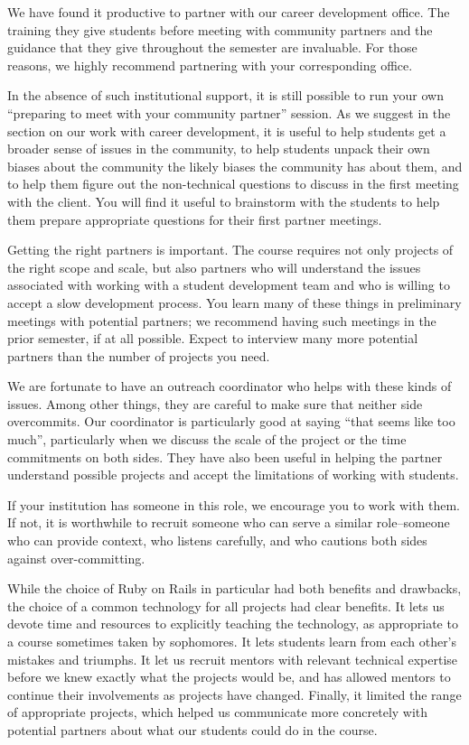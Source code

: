 We have found it productive to partner with our career development
office.  The training they give students before meeting with community
partners and the guidance that they give throughout the semester
are invaluable.  For those reasons, we highly recommend 
partnering with your corresponding office.

In the absence of such institutional support, it is still possible to run
your own ``preparing to meet with your community partner'' session.
As we suggest in the section on our work with career development,
it is useful to help students get a broader sense of issues in the
community, to help students unpack their own biases about the
community the likely biases the community has about them, and to
help them figure out the non-technical questions to discuss in the
first meeting with the client.  You will find it useful to brainstorm
with the students to help them prepare appropriate questions for
their first partner meetings.

Getting the right partners is important.  The course requires not
only projects of the right scope and scale, but also partners who
will understand the issues associated with working with a student
development team and who is willing to accept a slow development
process.  You learn many of these things in preliminary meetings
with potential partners; we recommend having such meetings in the
prior semester, if at all possible.  Expect to interview many more
potential partners than the number of projects you need.

We are fortunate to have an outreach coordinator who helps with these kinds
of issues.  Among other things, they are careful to make sure that neither
side overcommits.  Our coordinator is particularly good at saying ``that
seems like too much'', particularly when we discuss the scale of the project
or the time commitments on both sides.  They have also been useful in
helping the partner understand possible projects and accept the limitations
of working with students.

If your institution has someone in this role, we encourage you to
work with them.  If not,
it is worthwhile to recruit someone who can serve a similar 
role--someone who can provide context, who listens carefully, and who
cautions both sides against over-committing.

While the choice of Ruby on Rails in particular had both benefits and 
drawbacks, the choice of a common technology for all projects had clear 
benefits.  It lets us devote time and resources to explicitly teaching 
the technology, as appropriate to a course sometimes taken by sophomores. 
It lets students learn from each other's mistakes and triumphs.  
It let us recruit mentors with relevant technical expertise before we 
knew exactly what the projects would be, and has allowed mentors to continue 
their involvements as projects have changed.
Finally, it limited the range of appropriate projects, which helped us 
communicate more concretely with potential partners about what our 
students could do in the course.

